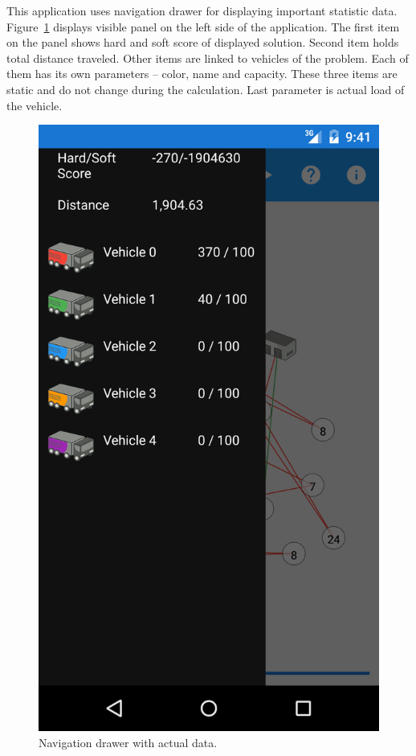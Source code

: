 This application uses navigation drawer for displaying important statistic data. Figure~\ref{NavigationDrawerFigure}
displays visible panel on the left side of the application. The first item on the panel shows hard and soft score of
displayed solution. Second item holds total distance traveled. Other items are linked to vehicles of the problem. Each
of them has its own parameters -- color, name and capacity. These three items are static and do not change during the
calculation. Last parameter is actual load of the vehicle.
\\
\begin{figure}[h!]
    \centering
    \includegraphics[scale=0.15]{fig/nav_drawer.png}
    \caption{Navigation drawer with actual data.}
    \label{NavigationDrawerFigure}
\end{figure}

